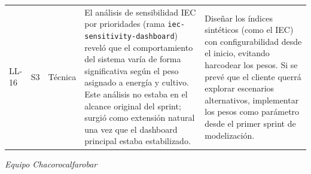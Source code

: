 \documentclass[11pt,a4paper]{article}
\begin{document}
\begin{longtable}{p{} p{} p{} p{} p{}}
\hline
LL-16 & S3 & Técnica & El análisis de sensibilidad IEC por prioridades (rama \texttt{iec-sensitivity-dashboard}) reveló que el comportamiento del sistema varía de forma significativa según el peso asignado a energía y cultivo. Este análisis no estaba en el alcance original del sprint; surgió como extensión natural una vez que el dashboard principal estaba estabilizado. & Diseñar los índices sintéticos (como el IEC) con configurabilidad desde el inicio, evitando harcodear los pesos. Si se prevé que el cliente querrá explorar escenarios alternativos, implementar los pesos como parámetro desde el primer sprint de modelización. \\
\end{longtable}

\vspace{2em}
\begin{center}
  \textit{Equipo Chacorocalfarobar}
\end{center}
\end{document}
